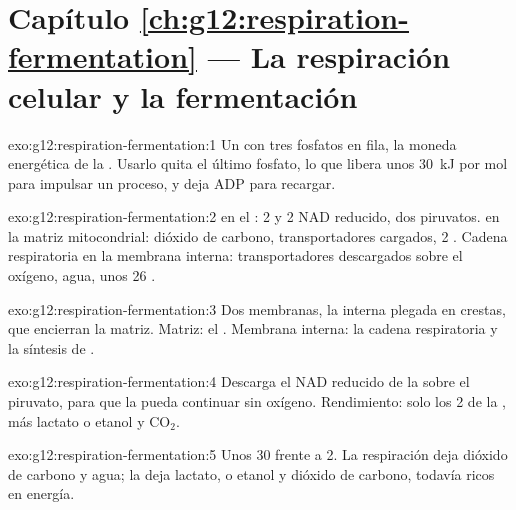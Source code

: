\section*{Capítulo \ref{ch:g12:respiration-fermentation} --- La respiración celular y la fermentación}

\begin{solution}{exo:g12:respiration-fermentation:1}
Un  con tres fosfatos en fila, la moneda energética de la
. Usarlo quita el último fosfato, lo que libera unos
\qty{30}{kJ} por mol para impulsar un proceso, y deja ADP para
recargar.
\end{solution}

\begin{solution}{exo:g12:respiration-fermentation:2}
 en el : 2  y 2 NAD reducido, dos piruvatos.
 en la matriz mitocondrial: dióxido de carbono,
transportadores cargados, 2 . Cadena respiratoria en la membrana
interna: transportadores descargados sobre el oxígeno, agua, unos 26
.
\end{solution}

\begin{solution}{exo:g12:respiration-fermentation:3}
Dos membranas, la interna plegada en crestas, que encierran la matriz.
Matriz: el . Membrana interna: la cadena respiratoria y
la síntesis de .
\end{solution}

\begin{solution}{exo:g12:respiration-fermentation:4}
Descarga el NAD reducido de la  sobre el piruvato, para que
la  pueda continuar sin oxígeno. Rendimiento: solo los 2 
de la , más lactato o etanol y $\mathrm{CO_2}$.
\end{solution}

\begin{solution}{exo:g12:respiration-fermentation:5}
Unos 30  frente a 2. La respiración deja dióxido de carbono y agua;
la  deja lactato, o etanol y dióxido de carbono, todavía
ricos en energía.
\end{solution}


